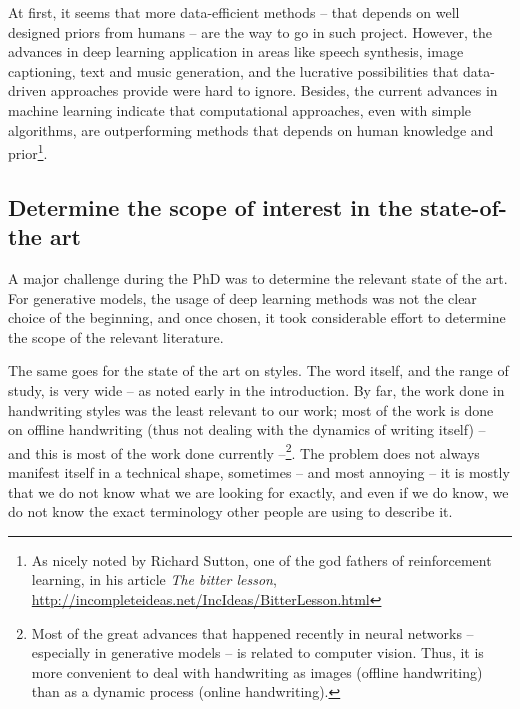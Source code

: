   \par At first, it seems that more data-efficient methods -- that depends on well designed priors from humans -- are the way to go in such project. However, the advances in deep learning application in areas like speech synthesis, image captioning, text and music generation, and the lucrative possibilities that data-driven approaches provide were hard to ignore. Besides, the current advances in machine learning indicate that computational approaches, even with simple algorithms, are outperforming methods that depends on human knowledge and prior\footnote{As nicely noted by Richard Sutton, one of the god fathers of reinforcement learning, in his article \textit{The bitter lesson}, \url{http://incompleteideas.net/IncIdeas/BitterLesson.html}}.

  \subsection{Determine the scope of interest in the state-of-the art}

    \par A major challenge during the PhD was to determine the relevant state of the art. For generative models, the usage of deep learning methods was not the clear choice of the beginning, and once chosen, it took considerable effort to determine the scope of the relevant literature.

    \par The same goes for the state of the art on styles. The word itself, and the range of study, is very wide -- as noted early in the introduction. By far, the work done in handwriting styles was the least relevant to our work; most of the work is done on offline handwriting (thus not dealing with the dynamics of writing itself) -- and this is most of the work done currently --\footnote{Most of the great advances that happened recently in neural networks -- especially in generative models -- is related to computer vision. Thus, it is more convenient to deal with handwriting as images (offline handwriting) than as a dynamic process (online handwriting).}. The problem does not always manifest itself in a technical shape, sometimes -- and most annoying -- it is mostly that we do not know what we are looking for exactly, and even if we do know, we do not know the exact terminology other people are using to describe it.



